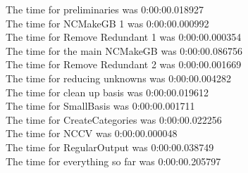 \documentclass[rep10,leqno]{report}
\begin{document}
\noindent
The time for preliminaries was 0:00:00.018927\\
The time for NCMakeGB 1 was 0:00:00.000992\\
The time for Remove Redundant 1 was 0:00:00.000354\\
The time for the main NCMakeGB was 0:00:00.086756\\
The time for Remove Redundant 2 was 0:00:00.001669\\
The time for reducing unknowns was 0:00:00.004282\\
The time for clean up basis was 0:00:00.019612\\
The time for SmallBasis was 0:00:00.001711\\
The time for CreateCategories was 0:00:00.022256\\
The time for NCCV was 0:00:00.000048\\
The time for RegularOutput was 0:00:00.038749\\
The time for everything so far was 0:00:00.205797\\
\end{document}
